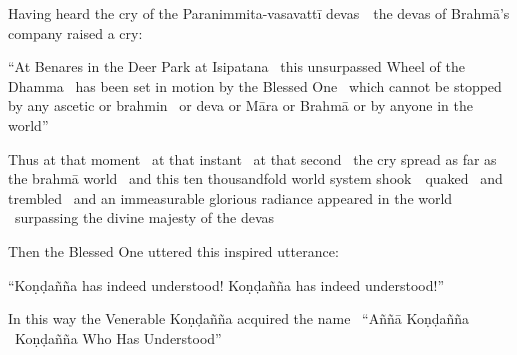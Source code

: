 \begin{english-only-hang}
  Having heard the cry of the Paranimmita-vasavattī \mbox{devas}~\breathmark\ the devas of Brahmā's company raised a cry:
\end{english-only-hang}

\begin{english-only-hang}
  ``At Benares in the Deer Park at Isipatana \breathmark\ this unsurpassed Wheel of the Dhamma \breathmark\ has been set in motion  by the Blessed One \breathmark\ which cannot be stopped by any ascetic or brahmin \breathmark\ or deva or Māra or Brahmā or by anyone in the world''
\end{english-only-hang}

\ifninebythirteen\clearpage\fi

\begin{english-only-hang}
  Thus at that moment \breathmark\ at that instant \breathmark\ at that second \breathmark\ the cry spread as far as the brahmā world \breathmark\ and this ten thousandfold world system \mbox{shook}~\breathmark\ quaked \breathmark\ and trembled \breathmark\ and an immeasurable glorious radiance appeared in the world \breathmark\ surpassing the divine majesty of the devas
\end{english-only-hang}

\begin{english-only-hang}
  Then the Blessed One uttered this inspired utterance:
\end{english-only-hang}

\begin{english-only-hang}
  ``Koṇḍañña has indeed understood! Koṇḍañña has indeed understood!''
\end{english-only-hang}

\begin{english-only-hang}
  In this way the Venerable Koṇḍañña acquired the name \breathmark\ ``Aññā Koṇḍañña \breathmark\ Koṇḍañña Who Has Understood''
\end{english-only-hang}

\suttaRef{[SN 56.11]}


